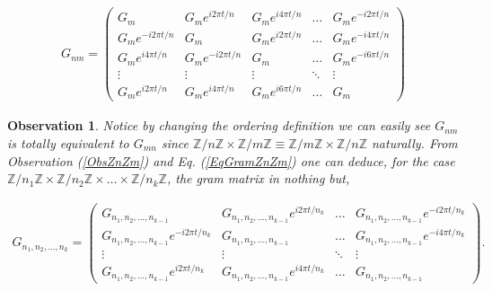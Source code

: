 \documentclass[12pt,letterpaper]{article}
\newtheorem{observation}{Observation}
\begin{document}
\begin{align}\label{EqGramZnZm}
G_{nm}=\begin{pmatrix}
 G_m & G_me^{i2\pi t/n} & G_me^{i4\pi t/n} & \hdots &  G_me^{-i2\pi t/n} \\
  G_me^{-i2\pi t/n} & G_m & G_me^{i2\pi t/n} & \hdots & G_me^{-i4\pi t/n} \\
  G_me^{i4\pi t/n} &  G_me^{-i2\pi t/n}  & G_m & \hdots & G_me^{-i6\pi t/n}  \\
   \vdots & \vdots & \vdots & \ddots & \vdots \\
  G_me^{i2\pi t/n} &G_me^{i4\pi t/n}  & G_me^{i6\pi t/n}  & \hdots &  G_m 
\end{pmatrix}
\end{align}

\begin{multicols}{2}
\begin{observation}
Notice by changing the ordering definition we can easily see $G_{nm}$ is totally equivalent to $G_{mn}$ since $\mathbb{Z}/n\mathbb{Z}\times\mathbb{Z}/m\mathbb{Z}\equiv \mathbb{Z}/m\mathbb{Z}\times\mathbb{Z}/n\mathbb{Z}$ naturally. From Observation (\ref{ObsZnZm}) and Eq. (\ref{EqGramZnZm}) one can deduce, for the case $\mathbb{Z}/n_1\mathbb{Z}\times\mathbb{Z}/n_2\mathbb{Z}\times\dots\times \mathbb{Z}/n_k\mathbb{Z}$, the gram matrix in nothing but,
\end{observation}
\end{multicols}
\begin{align}
G_{n_1,n_2,...,n_k}=\begin{pmatrix}
 G_{n_1,n_2,...,n_{k-1}} & G_{n_1,n_2,...,n_{k-1}}e^{i2\pi t/n_k} & \hdots &  G_{n_1,n_2,...,n_{k-1}}e^{-i2\pi t/n_k} \\
  G_{n_1,n_2,...,n_{k-1}}e^{-i2\pi t/n_k} & G_{n_1,n_2,...,n_{k-1}} & \hdots & G_{n_1,n_2,...,n_{k-1}}e^{-i4\pi t/n_k} \\
   \vdots & \vdots  & \ddots & \vdots \\
  G_{n_1,n_2,...,n_{k-1}}e^{i2\pi t/n_k} & G_{n_1,n_2,...,n_{k-1}}e^{i4\pi t/n_k}  & \hdots &  G_{n_1,n_2,...,n_{k-1}} 
\end{pmatrix}.
\end{align}
\end{document}
